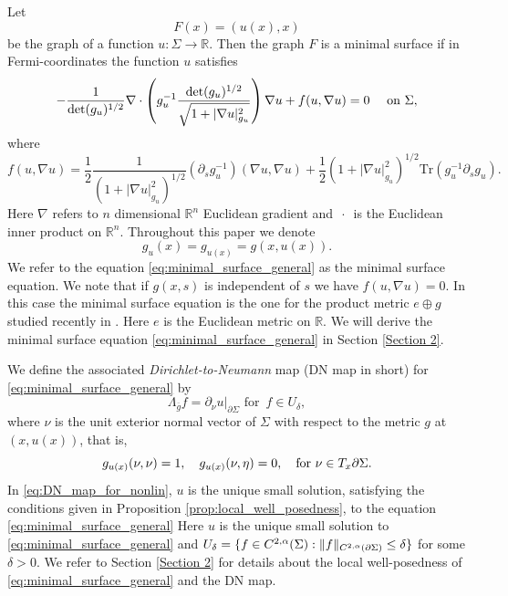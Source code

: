 \documentclass[12pt]{amsart}
\def\p{\partial}
\def\R{\mathbb R}
\DeclarePairedDelimiter\norm{\lVert}{\rVert}
\theoremstyle{definition}
\theoremstyle{remark}
\newcommand{\abs}[1]{\lvert #1 \rvert}
\newcommand{\ccdot}{\,\cdot\,}
\begin{document}
Let 
\[
 F(x)=(u(x),x)
\]
be the graph of a function $u:\Sigma\to \R$. 
Then the graph $F$ is a minimal surface if in Fermi-coordinates the function $u$ satisfies
\begin{equation}\label{eq:minimal_surface_general}
 -\frac{1}{\det(g_u)^{1/2}}\nabla\cdot \left( g_u^{-1}\frac{\det(g_u)^{1/2}}{\sqrt{1+\abs{\nabla u}^2_{g_u}}} \right)\nabla u + f(u,\nabla u) =0 \quad  \hbox{ on }\Sigma,
\end{equation}
where 
\[
 f(u,\nabla u)=\frac{1}{2}\frac{1}{(1+\abs{\nabla u}^2_{g_u})^{1/2}}(\p_sg_u^{-1})(\nabla u,\nabla u)+\frac{1}{2}(1+\abs{\nabla u}^2_{g_u})^{1/2}\text{Tr}(g_u^{-1}\p_sg_u).
\]
Here $\nabla$ refers to $n$ dimensional $\R^n$ Euclidean gradient and $\ccdot$ is the Euclidean inner product on $\R^n$. Throughout this paper we denote 
\[
 g_u(x)=g_{u(x)}=g(x, u(x)).
\]
We refer to the equation \eqref{eq:minimal_surface_general} as the minimal surface equation. We note that if $g(x,s)$ is independent of $s$ we have $f(u,\nabla u)=0$. In this case  the minimal surface equation is the one for the product metric $e\oplus g$ studied recently in \cite{carstea2022inverse}. Here $e$ is the Euclidean metric on $\R$. We will derive the minimal surface equation \eqref{eq:minimal_surface_general} in Section \ref{Section 2}.

We define the associated \emph{Dirichlet-to-Neumann} map (DN map in short) for \eqref{eq:minimal_surface_general} by
\begin{equation}\label{eq:DN_map_for_nonlin}
\Lambda_{\overline g} f = \left. \p_\nu u \right|_{\p \Sigma} \text{ for }  \, f \in U_\delta,
\end{equation}
where $\nu$  is the unit exterior normal vector of $\Sigma$ with respect to the metric $g$ at $(x,u(x))$,
that is, 
$$
g_{u(x)}(\nu,\nu)=1,\quad g_{u(x)}(\nu,\eta)=0,\quad \hbox{for }\nu\in T_x\partial \Sigma.
$$
In \eqref{eq:DN_map_for_nonlin}, $u$ is the unique small solution, satisfying the conditions given in Proposition \ref{prop:local_well_posedness}, to the equation \eqref{eq:minimal_surface_general}
Here $u$ is the unique small solution to \eqref{eq:minimal_surface_general} and $U_\delta=\{f\in  C^{2,\alpha}(\Sigma): \norm{f}_{C^{2,\alpha}(\p \Sigma)}\leq \delta\}$ for some $\delta>0$.  %
We refer to Section \ref{Section 2} for details about the local well-posedness of \eqref{eq:minimal_surface_general} and  the DN map. 
\end{document}
